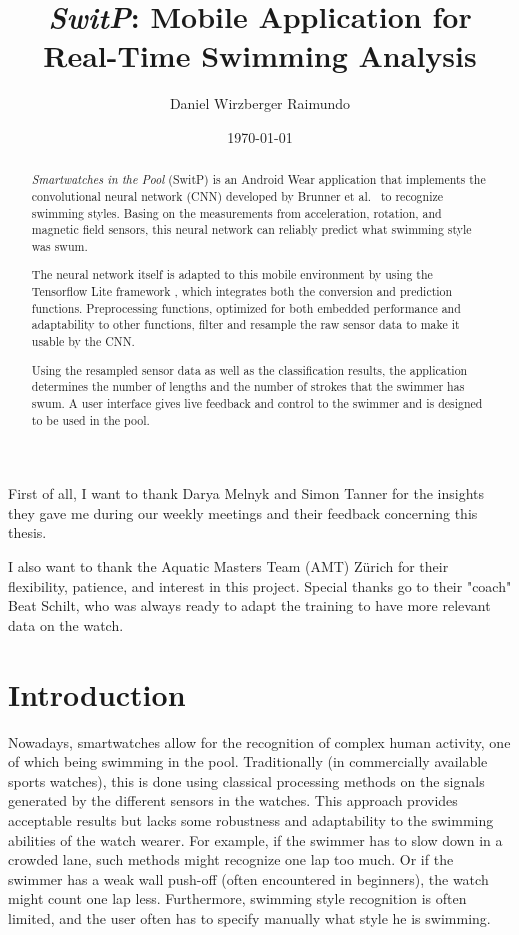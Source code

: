 \documentclass[a4paper, oneside]{discothesis}
\title{\textit{SwitP}: Mobile Application for Real-Time Swimming Analysis}
\author{Daniel Wirzberger Raimundo}
\institute{Distributed Computing Group \\[2pt]
Computer Engineering and Networks Laboratory \\[2pt]
ETH Zürich}
\date{\today}
\begin{document}
\frontmatter %
\maketitle

\cleardoublepage

\begin{acknowledgements}
First of all, I want to thank Darya Melnyk and Simon Tanner for the insights they gave me during our weekly meetings and their feedback concerning this thesis.

I also want to thank the Aquatic Masters Team (AMT) Zürich for their flexibility, patience, and interest in this project. Special thanks go to their "coach" Beat Schilt, who was always ready to adapt the training to have more relevant data on the watch.

\end{acknowledgements}


\begin{abstract}
\textit{Smartwatches in the Pool} (SwitP) is an Android Wear application that implements the convolutional neural network (CNN) developed by Brunner et al.~\cite{BMSW19} to recognize swimming styles. Basing on the measurements from acceleration, rotation, and magnetic field sensors, this neural network can reliably predict what swimming style was swum.

The neural network itself is adapted to this mobile environment by using the Tensorflow Lite framework \cite{TFLite20}, which integrates both the conversion and prediction functions. Preprocessing functions, optimized for both embedded performance and adaptability to other functions, filter and resample the raw sensor data to make it usable by the CNN.

Using the resampled sensor data as well as the classification results, the application determines the number of lengths and the number of strokes that the swimmer has swum. A user interface gives live feedback and control to the swimmer and is designed to be used in the pool.
\end{abstract}

\tableofcontents

\mainmatter %

\chapter{Introduction}
Nowadays, smartwatches allow for the recognition of complex human activity, one of which being swimming in the pool. Traditionally (in commercially available sports watches), this is done using classical processing methods on the signals generated by the different sensors in the watches. This approach provides acceptable results but lacks some robustness and adaptability to the swimming abilities of the watch wearer. For example, if the swimmer has to slow down in a crowded lane, such methods might recognize one lap too much. Or if the swimmer has a weak wall push-off (often encountered in beginners), the watch might count one lap less. Furthermore, swimming style recognition is often limited, and the user often has to specify manually what style he is swimming.
\end{document}
